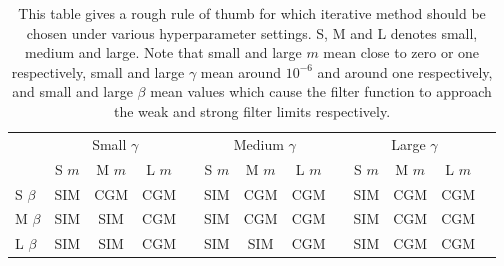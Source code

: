 

\begin{table}[h]
    \centering
    \footnotesize
    \def\arraystretch{1.4}
    \begin{tabular}{@{}lcccccccccccc@{}}
    \toprule
    & \multicolumn{3}{c}{Small $\gamma$} & \phantom{a} & \multicolumn{3}{c}{Medium $\gamma$} & \phantom{a} & \multicolumn{3}{c}{Large $\gamma$} \\
    \cmidrule{2-4} \cmidrule{6-8} \cmidrule{10-12}
    & S $m$   & M $m$  & L $m$ &&  S $m$   & M $m$  & L $m$ && S $m$   & M $m$  & L $m$ & \\ \midrule \rule{0pt}{0.8cm}
    S $\beta$  & \colorbox{sim!25}{SIM} & \colorbox{cgm!25}{CGM} & \colorbox{cgm!25}{CGM} && \colorbox{sim!25}{SIM} & \colorbox{cgm!25}{CGM} & \colorbox{cgm!25}{CGM} &&  \colorbox{sim!25}{SIM} & \colorbox{cgm!25}{CGM} & \colorbox{cgm!25}{CGM}    \\ \rule{0pt}{6ex}
    M $\beta$ & \colorbox{sim!25}{SIM} & \colorbox{sim!25}{SIM} & \colorbox{cgm!25}{CGM} && \colorbox{sim!25}{SIM} & \colorbox{cgm!25}{CGM} & \colorbox{cgm!25}{CGM} &&  \colorbox{sim!25}{SIM} & \colorbox{cgm!25}{CGM} & \colorbox{cgm!25}{CGM}    \\ \rule{0pt}{6ex}
    L $\beta$  & \colorbox{sim!25}{SIM} & \colorbox{sim!25}{SIM} & \colorbox{cgm!25}{CGM} && \colorbox{sim!25}{SIM} & \colorbox{sim!25}{SIM} & \colorbox{cgm!25}{CGM} &&  \colorbox{sim!25}{SIM} & \colorbox{cgm!25}{CGM} & \colorbox{cgm!25}{CGM}   \\[0.5cm] \bottomrule 
    \end{tabular}
    \caption[Rules of thumb for iterative method choice under different hyperparameter settings]{This table gives a rough rule of thumb for which iterative method should be chosen under various hyperparameter settings. S, M and L denotes small, medium and large. Note that small and large $m$ mean close to zero or one respectively, small and large $\gamma$ mean around $10^{-6}$ and around one respectively, and small and large $\beta$ mean values which cause the filter function to approach the weak and strong filter limits respectively. }
    \label{tab:decision_SIM_CGM} 
\end{table}








